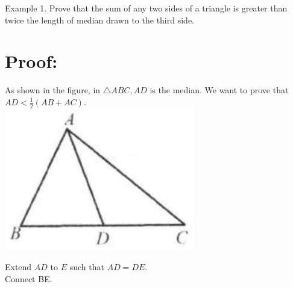 \documentclass[10pt]{article}
\begin{document}
Example 1. Prove that the sum of any two sides of a triangle is greater than twice the length of median drawn to the third side.

\section*{Proof:}
As shown in the figure, in \(\triangle A B C, A D\) is the median. We want to prove that \(A D<\frac{1}{2}(A B+A C)\).\\
\includegraphics[max width=\textwidth, center]{2025_04_17_97bc1f7e44d93c271a88g-023(1)}

Extend \(A D\) to \(E\) such that \(A D=D E\).\\
Connect BE.
\end{document}
